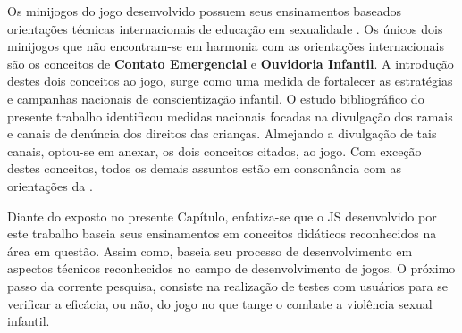 Os minijogos do jogo desenvolvido possuem seus ensinamentos baseados orientações técnicas internacionais de educação em sexualidade \cite{unesco2018international}. Os únicos dois minijogos que não encontram-se em harmonia com as orientações internacionais são os conceitos de \textbf{Contato Emergencial} e \textbf{Ouvidoria Infantil}. A introdução destes dois conceitos ao jogo, surge como uma medida de fortalecer as estratégias e campanhas nacionais de conscientização infantil. O estudo bibliográfico do presente trabalho identificou medidas nacionais focadas na divulgação dos ramais e canais de denúncia dos direitos das crianças. Almejando a divulgação de tais canais, optou-se em anexar, os dois conceitos citados, ao jogo. Com exceção destes conceitos, todos os demais assuntos estão em consonância com as orientações da . 

Diante do exposto no presente Capítulo, enfatiza-se que o \ac{JS} desenvolvido por este trabalho baseia seus ensinamentos em conceitos didáticos reconhecidos na área em questão. Assim como, baseia seu processo de desenvolvimento em aspectos técnicos reconhecidos no campo de  desenvolvimento de jogos. O próximo passo da corrente pesquisa, consiste na realização de testes com usuários para se verificar a eficácia, ou não, do jogo no que tange o combate a violência sexual infantil. 